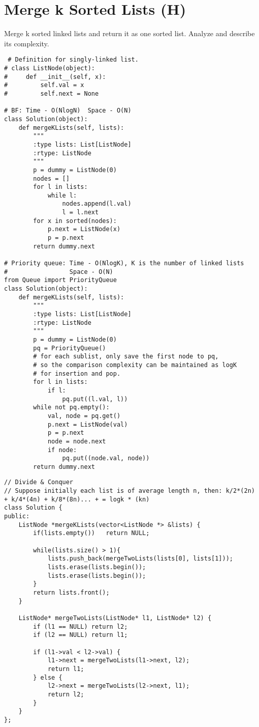 \section{Merge k Sorted Lists (H)}
Merge k sorted linked lists and return it as one sorted list. Analyze and describe its complexity. \\
 
 \begin{lstlisting}
 # Definition for singly-linked list.
# class ListNode(object):
#     def __init__(self, x):
#         self.val = x
#         self.next = None

# BF: Time - O(NlogN)  Space - O(N)
class Solution(object):
    def mergeKLists(self, lists):
        """
        :type lists: List[ListNode]
        :rtype: ListNode
        """
        p = dummy = ListNode(0)
        nodes = []
        for l in lists:
            while l:
                nodes.append(l.val)
                l = l.next
        for x in sorted(nodes):
            p.next = ListNode(x)
            p = p.next
        return dummy.next
    
# Priority queue: Time - O(NlogK), K is the number of linked lists
#                 Space - O(N)
from Queue import PriorityQueue
class Solution(object):
    def mergeKLists(self, lists):
        """
        :type lists: List[ListNode]
        :rtype: ListNode
        """
        p = dummy = ListNode(0)
        pq = PriorityQueue()
        # for each sublist, only save the first node to pq,
        # so the comparison complexity can be maintained as logK 
        # for insertion and pop.
        for l in lists:
            if l: 
                pq.put((l.val, l))
        while not pq.empty():
            val, node = pq.get()
            p.next = ListNode(val)
            p = p.next
            node = node.next
            if node: 
                pq.put((node.val, node))
        return dummy.next
\end{lstlisting}
 
\begin{lstlisting}
// Divide & Conquer
// Suppose initially each list is of average length n, then: k/2*(2n) + k/4*(4n) + k/8*(8n)... + = logk * (kn)
class Solution {
public:
    ListNode *mergeKLists(vector<ListNode *> &lists) {
        if(lists.empty())   return NULL;
        
        while(lists.size() > 1){
            lists.push_back(mergeTwoLists(lists[0], lists[1]));
            lists.erase(lists.begin());
            lists.erase(lists.begin());
        }
        return lists.front();
    }
    
    ListNode* mergeTwoLists(ListNode* l1, ListNode* l2) {
        if (l1 == NULL) return l2;
        if (l2 == NULL) return l1;
        
        if (l1->val < l2->val) {
            l1->next = mergeTwoLists(l1->next, l2);
            return l1;
        } else {
            l2->next = mergeTwoLists(l2->next, l1);
            return l2;
        }
    }
};
\end{lstlisting}


